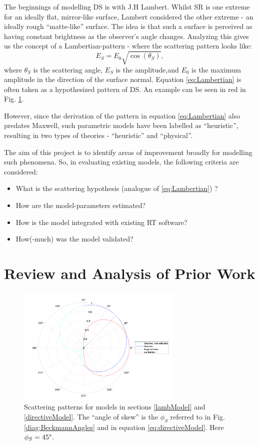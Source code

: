 \documentclass[lettersize,journal]{IEEEtran}
\begin{document}
The beginnings of modelling DS is with J.H Lambert.  Whilst SR is one extreme for an ideally flat, mirror-like surface, Lambert considered the other extreme  - an ideally rough ``matte-like'' surface. The idea is that such a surface is perceived as having constant brightness as the observer's angle changes. Analyzing this gives us the concept of a Lambertian-pattern - where the scattering pattern looks like:
\begin{equation}
E_S = E_0\sqrt{\cos(\theta_S)}, \label{eq:Lambertian}
\end{equation}
where $\theta_S$ is the scattering angle, $E_S$ is the amplitude,and $E_0$ is the maximum amplitude in the direction of the surface normal. Equation \eqref{eq:Lambertian} is often taken as a hypothesized pattern of DS. An example can be seen in red in Fig. \ref{diag:scattering}.


However, since the derivation of the pattern in equation \eqref{eq:Lambertian} also predates Maxwell, such parametric models have been labelled as ``heuristic'', resulting in two types of theories - ``heuristic'' and ``physical''.

The aim of this project is to identify areas of improvement broadly for modelling such phenomena. So, in evaluating existing models, the following criteria are considered:
\begin{itemize}
\item What is the scattering hypothesis (analogue of \eqref{eq:Lambertian}) ?
\item How are the model-parameters estimated?
\item How is the model integrated with existing RT software?
\item How(-much) was the model validated?
\end{itemize}

\pagebreak

\section{Review and Analysis of Prior Work}
\begin{figure}[b]
	\centering
	\includegraphics[width=3.1in]{ScatteringPatterns}
	\captionsetup{singlelinecheck=off}
		\caption[]{Scattering patterns for models in sections \ref{lambModel} and \ref{directiveModel}. The ``angle of skew'' is the $\phi_S$ referred to in Fig. \ref{diag:BeckmannAngles} and in equation \eqref{eq:directiveModel}. Here $\phi_S = 45 \degree$. }
	\label{diag:scattering}
\end{figure}
\end{document}

